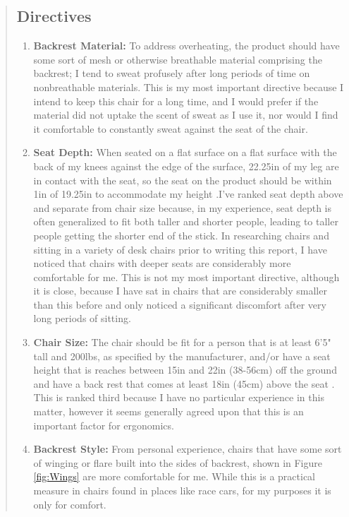 \documentclass[11pt]{article}
\begin{document}
\begin{quote}
        \subsection{Directives}
        \begin{enumerate}
            \item \textbf{Backrest Material:} To address overheating, the product should have some sort of mesh or otherwise breathable material comprising the backrest; I tend to sweat profusely after long periods of time on nonbreathable materials. This is my most important directive because I intend to keep this chair for a long time, and I would prefer if the material did not uptake the scent of sweat as I use it, nor would I find it comfortable to constantly sweat against the seat of the chair.
            \item \textbf{Seat Depth:} When seated on a flat surface on a flat surface with the back of my knees against the edge of the surface, 22.25in of my leg are in contact with the seat, so the seat on the product should be within 1in of 19.25in to accommodate my height \cite{howe_2016}.I've ranked seat depth above and separate from chair size because, in my experience, seat depth is often generalized to fit both taller and shorter people, leading to taller people getting the shorter end of the stick. In researching chairs and sitting in a variety of desk chairs prior to writing this report, I have noticed that chairs with deeper seats are considerably more comfortable for me. This is not my most important directive, although it is close, because I have sat in chairs that are considerably smaller than this before and only noticed a significant discomfort after very long periods of sitting.
            \item \textbf{Chair Size:} The chair should be fit for a person that is at least 6'5" tall and 200lbs, as specified by the manufacturer, and/or have a seat height that is reaches between 15in and 22in (38-56cm) off the ground and have a back rest that comes at least 18in (45cm) above the seat \cite{seating-viewing-considerations}. This is ranked third because I have no particular experience in this matter, however it seems generally agreed upon that this is an important factor for ergonomics.
            \item \textbf{Backrest Style:} From personal experience, chairs that have some sort of winging or flare built into the sides of backrest, shown in Figure \ref{fig:Wings} are more comfortable for me. While this is a practical measure in chairs found in places like race cars, for my purposes it is only for comfort. 

\end{enumerate}
\end{quote}
\end{document}
